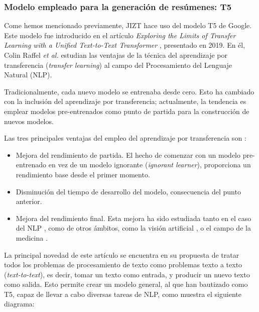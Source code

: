 \bigskip
\subsubsection{Modelo empleado para la generación de resúmenes: T5}

Come hemos mencionado previamente, JIZT hace uso del modelo T5 de Google. Este modelo fue introducido en el artículo \emph{Exploring the Limits of Transfer Learning with a Unified Text-to-Text Transformer} \cite{raffel19}, presentado en 2019. En él, Colin Raffel \emph{et al.} estudian las ventajas de la técnica del aprendizaje por transferencia (\emph{transfer learning}) al campo del Procesamiento del Lenguaje Natural (NLP).

Tradicionalmente, cada nuevo modelo se entrenaba desde cero. Esto ha cambiado con la inclusión del aprendizaje por transferencia; actualmente, la tendencia es emplear modelos pre-entrenados como punto de partida para la construcción de nuevos modelos.

Las tres principales ventajas del empleo del aprendizaje por transferencia son \cite{sarkar18}:

\vspace*{-\baselineskip}
\begin{itemize}
	\item [\textbullet] Mejora del rendimiento de partida. El hecho de comenzar con un modelo pre-entrenado en vez de un modelo ignorante (\emph{ignorant learner}), proporciona un rendimiento base desde el primer momento.
	
	\item [\textbullet] Disminución del tiempo de desarrollo del modelo, consecuencia del punto anterior.
	
	\item [\textbullet] Mejora del rendimiento final. Esta mejora ha sido estudiada tanto en el caso del NLP \cite{kumar21}, como de otros ámbitos, como la visión artificial \cite{ali21}, o el campo de la medicina \cite{liu21}.
\end{itemize}

La principal novedad de este artículo se encuentra en su propuesta de tratar todos los problemas de procesamiento de texto como problemas texto a texto (\emph{text-to-text}), es decir, tomar un texto como entrada, y producir un nuevo texto como salida. Esto permite crear un modelo general, al que han bautizado como T5, capaz de llevar a cabo diversas tareas de NLP, como muestra el siguiente diagrama:

\bigskip


